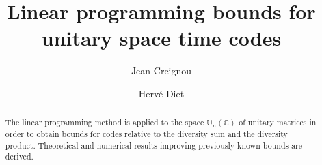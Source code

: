 \documentclass[10pt]{article}
\begin{document}
\title{Linear programming bounds for unitary space time codes}

\author{
{Jean Creignou}
\and
 {Herv\'e Diet}
}





\newtheorem{defi}{Definition}[section]
\newtheorem{definition}[defi]{Definition}
\newtheorem{proposition}[defi]{Proposition}
\newtheorem{theorem}[defi]{Theorem}
\newtheorem{remark}[defi]{Remark}
\newtheorem{corollary}[defi]{Corollary}
\newtheorem{lemma}[defi]{Lemma}


\newcommand {\F}{\mathbb{F}}
\newcommand {\G}{\mathcal{G}}
\newcommand {\ie} {\textit{i.e.}}
\newcommand {\trace}{\textrm{Trace}}
\newcommand {\conj}[1] {\overline{#1}}
\newcommand {\Chi} {\chi}
\newcommand{\Nu}{\mathcal V}
\newcommand{\N}{\mathbb{N}}
\newcommand{\Z}{\mathbb{Z}}
\newcommand{\R}{\mathbb{R}}
\newcommand{\C}{\mathbb{C}}
\newcommand{\U}{\mathbb{U}}
\newcommand{\PS}{\mathcal{P}}
\newcommand{\QS}{\mathcal{Q}}
\newcommand{\Code}{\mathcal V} %
\newcommand{\Cl}[2]{ \textrm{Cl}_{#1}({#2})}


\newenvironment{proof}{\noindent {\bf Proof :}}{}


\maketitle

\begin{abstract} 
The linear programming method is applied to the space $\U_n(\C)$ of
unitary matrices  in order 
 to obtain bounds for codes relative to the diversity sum and the diversity product.
 Theoretical and numerical results improving previously known bounds are derived.
 \end{abstract}
\end{document}
